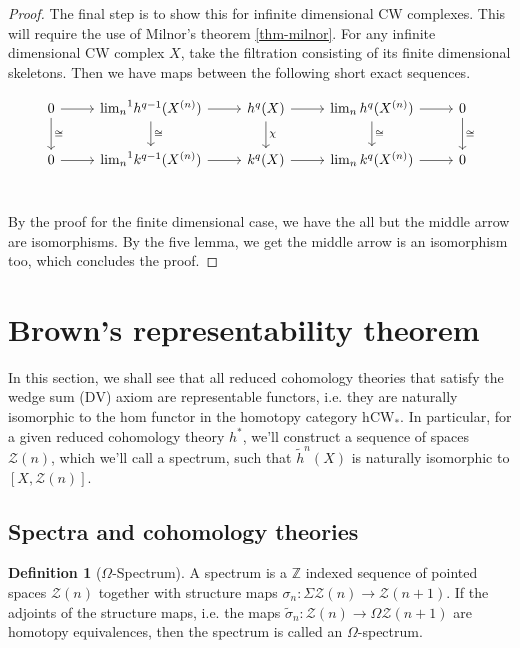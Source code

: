 \documentclass[12pt, notitlepage]{article}
\theoremstyle{definition}
\newtheorem{defn}{Definition}[section]
\newcommand{\cat}[1]{\mathrm{#1}}
\newcommand{\cohomtheorie}{{h}^{\ast}}
\newcommand{\calz}{\mathcal{Z}}
\newcommand{\redco}{\widetilde{h}}
\newcommand{\dv}{\mathrm{DV}}
\begin{document}
\begin{proof}
  The final step is to show this for infinite dimensional CW complexes. This will require the use of
  Milnor's theorem \ref{thm-milnor}. For any infinite dimensional CW complex $X$, take the
  filtration consisting of its finite dimensional skeletons. Then we have maps between the following
  short exact sequences.
  \[
    \begin{tikzpicture}
      \node[scale=1] (a) at (0,0) {
        \begin{tikzcd}
          0 \ar[r] \ar[d, "\cong"] & {\lim_n}^1 h^{q-1}(X^{(n)}) \ar[r] \ar[d, "\cong"]& h^q(X) \ar[r] \ar[d, "\chi"] & \lim_n h^q(X^{(n)}) \ar[r] \ar[d, "\cong"]& 0 \ar[d, "\cong"]\\
          0 \ar[r] & {\lim_n}^1 k^{q-1}(X^{(n)}) \ar[r] & k^q(X) \ar[r] & \lim_n k^q(X^{(n)}) \ar[r] & 0 \\
        \end{tikzcd}
      };
    \end{tikzpicture}
  \]
  By the proof for the finite dimensional case, we have the all but the middle arrow are
  isomorphisms. By the five lemma, we get the middle arrow is an isomorphism too, which concludes
  the proof.
  
\end{proof}

\section{Brown's representability theorem}
\label{sec:browns-repr-theor}

In this section, we shall see that all reduced cohomology theories that satisfy the wedge sum
($\dv$) axiom are representable functors, i.e. they are naturally isomorphic to the hom functor in
the homotopy category $\cat{hCW}_{\ast}$. In particular, for a given reduced cohomology theory
$\cohomtheorie$, we'll construct a sequence of spaces $\calz(n)$, which we'll call a spectrum, such
that $\redco^n(X)$ is naturally isomorphic to $\left[X, \calz(n)\right]$.

\subsection{Spectra and cohomology theories}
\label{sec:spectra-cohom-theor}

\begin{defn}[$\Omega$-Spectrum]
  A spectrum is a $\mathbb{Z}$ indexed sequence of pointed spaces $\calz(n)$ together with structure
  maps $\sigma_n: \Sigma \calz(n) \to \calz(n+1)$. If the adjoints of the structure maps, i.e. the
  maps $\widetilde{\sigma}_n: \calz(n) \to \Omega \calz(n+1)$ are homotopy equivalences, then the
  spectrum is called an $\Omega$-spectrum.
\end{defn}
\end{document}
